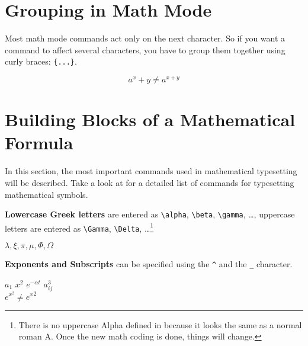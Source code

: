 \section{Grouping in Math Mode}

Most math mode commands act only on the next character. So if you
want a command to affect several characters, you have to group them
together using curly braces: \verb|{...}|.

\begin{singlespace}
\begin{example}
\begin{equation}
a^x+y \neq a^{x+y}
\end{equation}
\end{example}
\end{singlespace}
 
\section{Building Blocks of a Mathematical Formula}

In this section, the most important commands used in mathematical
typesetting will be described. Take a look at \citet{kd03} for a detailed list of commands for typesetting
mathematical symbols.

\textbf{Lowercase Greek letters} are entered as \verb|\alpha|,
 \verb|\beta|, \verb|\gamma|, \ldots, uppercase letters
are entered as \verb|\Gamma|, \verb|\Delta|, \ldots\footnote{There is no
  uppercase Alpha defined in \LaTeXe{} because it looks the same as a
  normal roman A. Once the new math coding is done, things will
  change.} 

\begin{singlespace}
\begin{example}
$\lambda,\xi,\pi,\mu,\Phi,\Omega$
\end{example}
\end{singlespace}
 
\textbf{Exponents and Subscripts} can be specified using
the \verb|^| and the \verb|_| character.

\begin{singlespace}
\begin{example}
$a_{1}$ \qquad $x^{2}$ \qquad
$e^{-\alpha t}$ \qquad
$a^{3}_{ij}$\\
$e^{x^2} \neq {e^x}^2$
\end{example}
\end{singlespace}

